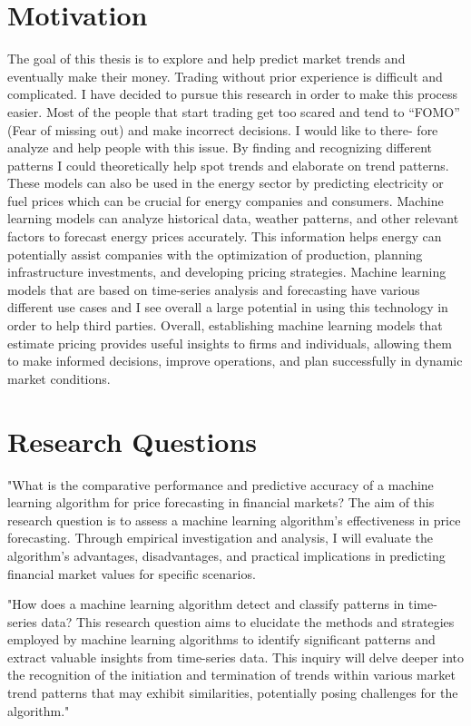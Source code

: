 \documentclass{imc-inf}
\begin{document}
\section{Motivation}
The goal of this thesis is to explore and help predict market trends and
eventually make their money. Trading without prior experience is difficult
and complicated. I have decided to pursue this research in order to make this
process easier. Most of the people that start trading get too scared and tend to
“FOMO” (Fear of missing out) and make incorrect decisions. I would like to there-
fore analyze and help people with this issue. By finding and recognizing different
patterns I could theoretically help spot trends and elaborate on trend patterns.
These models can also be used in the energy sector by predicting electricity or
fuel prices which can be crucial for energy companies and consumers. Machine
learning models can analyze historical data, weather patterns, and other relevant
factors to forecast energy prices accurately. This information helps energy can potentially assist companies with the optimization of production,
planning infrastructure investments, and developing pricing strategies. Machine learning models that
are based on time-series analysis and forecasting have various different use cases
and I see overall a large potential in using this technology in order to help third parties. Overall, establishing machine learning models that estimate pricing provides
useful insights to firms and individuals, allowing them to make informed decisions,
improve operations, and plan successfully in dynamic market conditions.

\section{Research Questions} 

"What is the comparative performance and predictive accuracy of a machine learning
algorithm for price forecasting in financial markets? The aim of this research
question is to assess a machine learning algorithm's effectiveness in price forecasting.
Through empirical investigation and analysis, I will evaluate the algorithm's advantages,
disadvantages, and practical implications in predicting financial market values for specific scenarios.


"How does a machine learning algorithm detect and classify patterns in time-series data?
This research question aims to elucidate the methods and strategies employed by machine learning algorithms 
to identify significant patterns and extract valuable insights from time-series data.
This inquiry will delve deeper into the recognition of the initiation and termination
of trends within various market trend patterns that may exhibit similarities,
potentially posing challenges for the algorithm."
\end{document}
